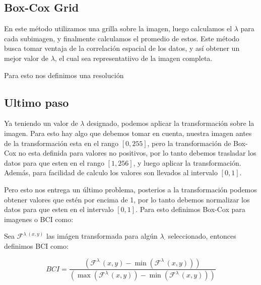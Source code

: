     \subsection[short]{Box-Cox Grid}

    En este m\'etodo utilizamos una grilla sobre la imagen, luego calculamos el $\lambda$ para cada subimagen, y finalmente calculamos el promedio de estos. Este m\'etodo busca tomar ventaja de la correlaci\'on espacial de los datos, y as\'i obtener un mejor valor de $\lambda$, el cual sea representatiivo de la imagen completa.

    Para esto nos definimos una resoluci\'on 

    
    

    \subsection{Ultimo paso}

    Ya teniendo un valor de $\lambda$ designado, podemos aplicar la transformaci\'on sobre la imagen. Para esto hay algo que debemos tomar en cuenta, nuestra imagen antes de la transformaci\'on esta en el rango $[0,255]$, pero la transformaci\'on de Box-Cox no esta definida para valores no positivos, por lo tanto debemos trasladar los datos para que esten en el rango $[1,256]$, y luego aplicar la transformaci\'on. Adem\'as, para facilidad de calculo los valores son llevados al intervalo $[0,1]$.


    Pero esto nos entrega un \'ultimo problema, posterios a la transformaci\'on podemos obtener valores que est\'en por encima de 1, por lo tanto debemos normalizar los datos para que esten en el intervalo $[0,1]$. Para esto definimos Box-Cox para imagenes o BCI como:

    \begin{defn}

        Sea $\mathcal{F}^{\lambda_{\cdot}(x, y)}$ las im\'agen transformada para alg\'un $\lambda_\cdot$ seleccionado, entonces definimos BCI como:

    \begin{equation}
        BCI = \frac{\left(\mathcal{F}^{\lambda_{\cdot}}(x, y) - \min\left(\mathcal{F}^{\lambda_{\cdot}}(x, y)\right)\right)}{\left(\max\left(\mathcal{F}^{\lambda_{\cdot}}(x, y)\right) - \min\left(\mathcal{F}^{\lambda_{\cdot}}(x, y)\right)\right)}
    \end{equation}
        
        
    \end{defn}


